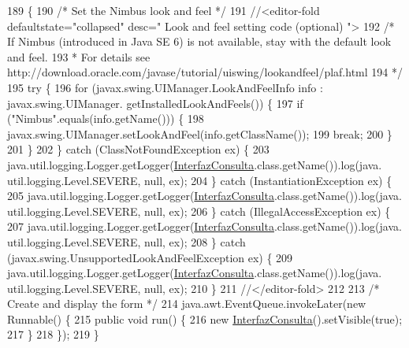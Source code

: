 \begin{DoxyCode}
189                                            \{
190         \textcolor{comment}{/* Set the Nimbus look and feel */}
191         \textcolor{comment}{//<editor-fold defaultstate="collapsed" desc=" Look and feel setting code (optional) ">}
192         \textcolor{comment}{/* If Nimbus (introduced in Java SE 6) is not available, stay with the default look and feel.}
193 \textcolor{comment}{         * For details see http://download.oracle.com/javase/tutorial/uiswing/lookandfeel/plaf.html }
194 \textcolor{comment}{         */}
195         \textcolor{keywordflow}{try} \{
196             \textcolor{keywordflow}{for} (javax.swing.UIManager.LookAndFeelInfo info : javax.swing.UIManager.
      getInstalledLookAndFeels()) \{
197                 \textcolor{keywordflow}{if} (\textcolor{stringliteral}{"Nimbus"}.equals(info.getName())) \{
198                     javax.swing.UIManager.setLookAndFeel(info.getClassName());
199                     \textcolor{keywordflow}{break};
200                 \}
201             \}
202         \} \textcolor{keywordflow}{catch} (ClassNotFoundException ex) \{
203             java.util.logging.Logger.getLogger(\mbox{\hyperlink{class_interfaz_package_1_1_interfaz_consulta_a58097671d4b2680db3ec600ad744ebd9}{InterfazConsulta}}.class.getName()).log(java.
      util.logging.Level.SEVERE, null, ex);
204         \} \textcolor{keywordflow}{catch} (InstantiationException ex) \{
205             java.util.logging.Logger.getLogger(\mbox{\hyperlink{class_interfaz_package_1_1_interfaz_consulta_a58097671d4b2680db3ec600ad744ebd9}{InterfazConsulta}}.class.getName()).log(java.
      util.logging.Level.SEVERE, null, ex);
206         \} \textcolor{keywordflow}{catch} (IllegalAccessException ex) \{
207             java.util.logging.Logger.getLogger(\mbox{\hyperlink{class_interfaz_package_1_1_interfaz_consulta_a58097671d4b2680db3ec600ad744ebd9}{InterfazConsulta}}.class.getName()).log(java.
      util.logging.Level.SEVERE, null, ex);
208         \} \textcolor{keywordflow}{catch} (javax.swing.UnsupportedLookAndFeelException ex) \{
209             java.util.logging.Logger.getLogger(\mbox{\hyperlink{class_interfaz_package_1_1_interfaz_consulta_a58097671d4b2680db3ec600ad744ebd9}{InterfazConsulta}}.class.getName()).log(java.
      util.logging.Level.SEVERE, null, ex);
210         \}
211         \textcolor{comment}{//</editor-fold>}
212 
213         \textcolor{comment}{/* Create and display the form */}
214         java.awt.EventQueue.invokeLater(\textcolor{keyword}{new} Runnable() \{
215             \textcolor{keyword}{public} \textcolor{keywordtype}{void} run() \{
216                 \textcolor{keyword}{new} \mbox{\hyperlink{class_interfaz_package_1_1_interfaz_consulta_a58097671d4b2680db3ec600ad744ebd9}{InterfazConsulta}}().setVisible(\textcolor{keyword}{true});
217             \}
218         \});
219     \}
\end{DoxyCode}


